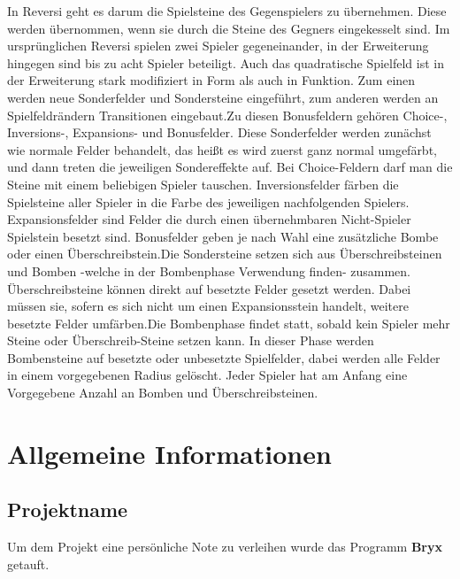 \documentclass[12pt,a4paper]{article}
\begin{document}
In Reversi geht es darum die Spielsteine des Gegenspielers zu übernehmen. Diese werden übernommen, wenn sie durch die Steine des Gegners eingekesselt sind. Im ursprünglichen Reversi spielen zwei Spieler gegeneinander, in der Erweiterung hingegen sind bis zu acht Spieler beteiligt. Auch das quadratische Spielfeld ist in der Erweiterung stark modifiziert in Form als auch in Funktion. Zum einen werden neue Sonderfelder und Sondersteine eingeführt, zum anderen werden an Spielfeldrändern Transitionen eingebaut.\newline Zu diesen Bonusfeldern gehören Choice-, Inversions-, Expansions- und Bonusfelder. Diese Sonderfelder werden zunächst wie normale Felder behandelt, das heißt es wird zuerst ganz normal umgefärbt, und dann treten die jeweiligen Sondereffekte auf. Bei Choice-Feldern darf man die Steine mit einem beliebigen Spieler tauschen. Inversionsfelder färben die Spielsteine aller Spieler in die Farbe des jeweiligen nachfolgenden Spielers. Expansionsfelder sind Felder die durch einen übernehmbaren Nicht-Spieler Spielstein besetzt sind. Bonusfelder geben je nach Wahl eine zusätzliche Bombe oder einen Überschreibstein.\newline Die Sondersteine setzen sich aus Überschreibsteinen und Bomben -welche in der Bombenphase Verwendung finden- zusammen. Überschreibsteine können direkt auf besetzte Felder gesetzt werden. Dabei müssen sie, sofern es sich nicht um einen Expansionsstein handelt, weitere besetzte Felder umfärben.Die Bombenphase findet statt, sobald kein Spieler mehr Steine oder Überschreib-Steine setzen kann. In dieser Phase werden Bombensteine auf besetzte oder unbesetzte Spielfelder, dabei werden alle Felder in einem vorgegebenen Radius gelöscht. Jeder Spieler hat am Anfang eine Vorgegebene Anzahl an Bomben und Überschreibsteinen.
\newpage
\section{Allgemeine Informationen}

\subsection{Projektname}
Um dem Projekt eine persönliche Note zu verleihen wurde das Programm \glqq \textbf{Bryx}\grqq{} getauft.
\end{document}
